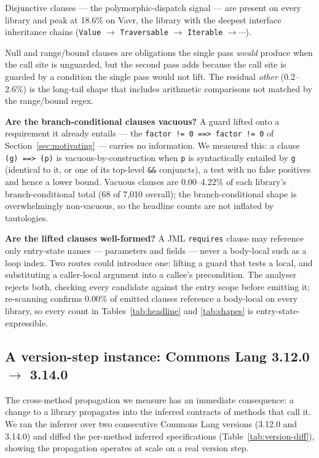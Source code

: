 Disjunctive clauses --- the polymorphic-dispatch signal --- are present
on every library and peak at 18.6\% on Vavr, the library with the
deepest interface inheritance chains (\texttt{Value} $\to$
\texttt{Traversable} $\to$ \texttt{Iterable} $\to \cdots$).

Null and range/bound clauses are obligations the single pass
\emph{would} produce when the call site is unguarded, but the second
pass adds because the call site is guarded by a condition the single
pass would not lift. The residual \emph{other} (0.2--2.6\%) is the
long-tail shape that includes arithmetic comparisons not matched by the
range/bound regex.

\textbf{Are the branch-conditional clauses vacuous?} A guard lifted
onto a requirement it already entails --- the
\texttt{factor != 0 ==> factor != 0} of Section~\ref{sec:motivating}
--- carries no information. We measured this: a clause
\texttt{(g) ==> (p)} is vacuous-by-construction when \texttt{p} is
syntactically entailed by \texttt{g} (identical to it, or one of its
top-level \texttt{\&\&} conjuncts), a test with no false positives and
hence a lower bound. Vacuous clauses are 0.00--4.22\% of each
library's branch-conditional total (68 of 7{,}010 overall); the
branch-conditional shape is overwhelmingly non-vacuous, so the
headline counts are not inflated by tautologies.

\textbf{Are the lifted clauses well-formed?} A JML \texttt{requires}
clause may reference only entry-state names --- parameters and fields
--- never a body-local such as a loop index. Two routes could
introduce one: lifting a guard that tests a local, and substituting a
caller-local argument into a callee's precondition. The analyser
rejects both, checking every candidate against the entry scope before
emitting it; re-scanning confirms 0.00\% of emitted clauses reference
a body-local on every library, so every count in
Tables~\ref{tab:headline} and \ref{tab:shapes} is
entry-state-expressible.

\subsection{A version-step instance: Commons Lang 3.12.0 \texorpdfstring{$\to$}{->} 3.14.0}
\label{sec:empirical-version}

The cross-method propagation we measure has an immediate consequence: a change to a library propagates into the inferred contracts of methods that call it. We ran the inferrer over two consecutive Commons Lang versions (3.12.0 and 3.14.0) and diffed the per-method inferred specifications (Table~\ref{tab:version-diff}), showing the propagation operates at scale on a real version step.

